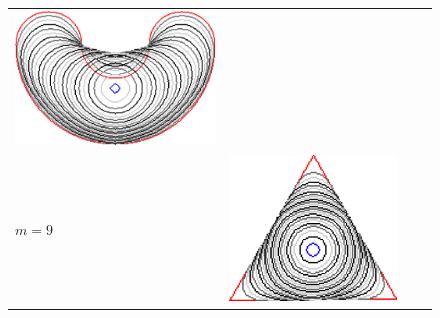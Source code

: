 \begin{figure}
\begin{tabular}{p{3em}ccc}
\includegraphics[scale=0.25]{figures/chapter6/level-effect/bean/improve/len_pen0/radius-9/level8/summary.pdf} \\[2em]
$m=9$ & \includegraphics[scale=0.25]{figures/chapter6/level-effect/triangle/improve/len_pen0/radius-9/level9/summary.pdf} &

\end{tabular}
\end{figure}
